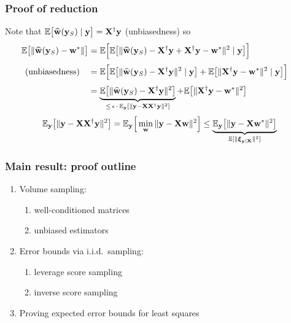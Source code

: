 \documentclass{beamer}
\begin{document}
\begin{frame}
  \frametitle{Proof of reduction}
  Note that $\mathbb E\big[\widehat{\mathbf w}(\mathbf y_S)\mid\mathbf y\big]=\mathbf X^\dagger\mathbf y$ (unbiasedness) so
  \begin{align*}
\hspace{-4mm}\E\big[\|\wbh(\y_S)-\w^*\|\big]
    &= \E\Big[\E\big[\|\wbh(\y_S)-\X^\dagger\y +
      \X^\dagger\y -\w^*\|^2\mid\y\big]\Big]
    \\[1mm]
    \hspace{-4mm}\text{(unbiasedness)}\quad
    &=\E\Big[\E\big[\|\wbh(\y_S)-\X^\dagger\y\|^2\mid\y\big] +
    \E\big[\|\X^\dagger\y -\w^*\|^2\mid\y\big]\Big]
    \\[1mm]
    &=\underbrace{\E\big[\|\wbh(\y_S)-\X^\dagger\y\|^2\big]}_{\leq\,\epsilon\,\cdot\,\E_{\y}[ \|\y-\X\X^\dagger\y\|^2]} +
\E\big[\|\X^\dagger\y -\w^*\|^2\big]
  \end{align*}
  \pause
  \begin{align*}
    \mathbb E_{\mathbf y}\big[\|\mathbf y-\mathbf X\mathbf X^\dagger\mathbf y\|^2\big] =
    \mathbb E_{\mathbf y}\Big[\min_\mathbf w\|\mathbf y-\mathbf X\mathbf w\|^2\Big]\leq \underbrace{\mathbb E_{\mathbf y}\big[\|\mathbf y-\mathbf X\mathbf w^*\|^2\big]}_{\mathbb E[\|\boldsymbol\xi_{\mathbf y|\mathbf X}\|^2]}
  \end{align*}
\end{frame}

\begin{frame}
  \frametitle{Main result: proof outline}
  \pause
  \begin{enumerate}
  \item Volume sampling:\\[1mm]\pause
    \begin{enumerate}
    \item well-conditioned matrices\\[1mm]\pause
    \item unbiased estimators\\[4mm]
    \end{enumerate}
    \pause
  \item Error bounds via i.i.d.~sampling:\\[1mm]\pause
    \begin{enumerate}
    \item leverage score sampling\\[1mm]\pause
    \item inverse score sampling\\[4mm]\pause
    \end{enumerate}
  \item Proving expected error bounds for least squares
  \end{enumerate}
\end{frame}
\end{document}
